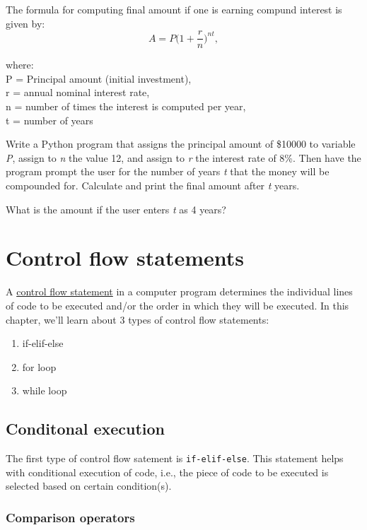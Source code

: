 \documentclass[
  letterpaper,
  DIV=11,
  numbers=noendperiod]{scrreprt}
\providecommand{\tightlist}{%
  \setlength{\itemsep}{0pt}\setlength{\parskip}{0pt}}\usepackage{longtable,booktabs,array}
\begin{document}
The formula for computing final amount if one is earning compund
interest is given by: \[A = P\bigg(1+\frac{r}{n}\bigg)^{nt},\]

where:\\
P = Principal amount (initial investment),\\
r = annual nominal interest rate,\\
n = number of times the interest is computed per year,\\
t = number of years

Write a Python program that assigns the principal amount of \$10000 to
variable \emph{P}, assign to \emph{n} the value 12, and assign to
\emph{r} the interest rate of 8\%. Then have the program prompt the user
for the number of years \emph{t} that the money will be compounded for.
Calculate and print the final amount after \emph{t} years.

What is the amount if the user enters \emph{t} as 4 years?

\hypertarget{control-flow-statements}{%
\chapter{Control flow statements}\label{control-flow-statements}}

A \href{https://docs.python.org/3/tutorial/controlflow.html}{control
flow statement} in a computer program determines the individual lines of
code to be executed and/or the order in which they will be executed. In
this chapter, we'll learn about 3 types of control flow statements:

\begin{enumerate}
\def\labelenumi{\arabic{enumi}.}
\tightlist
\item
  if-elif-else
\item
  for loop
\item
  while loop
\end{enumerate}

\hypertarget{conditonal-execution}{%
\section{Conditonal execution}\label{conditonal-execution}}

The first type of control flow satement is \texttt{if-elif-else}. This
statement helps with conditional execution of code, i.e., the piece of
code to be executed is selected based on certain condition(s).

\hypertarget{comparison-operators}{%
\subsection{Comparison operators}\label{comparison-operators}}
\end{document}
